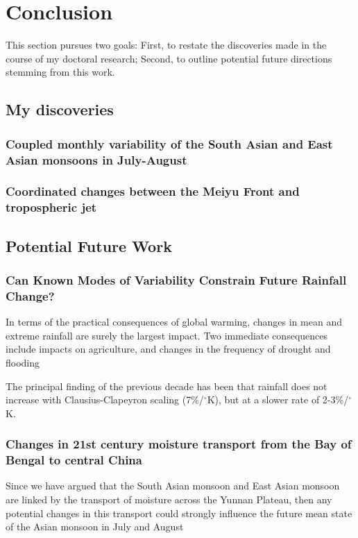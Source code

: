 \chapter{Conclusion}

This section pursues two goals: First, to restate the discoveries made in the course of my doctoral research; Second, to outline potential future directions stemming from this work.

\section{My discoveries}

\subsection{Coupled monthly variability of the South Asian and East Asian monsoons in July-August}

\subsection{Coordinated changes between the Meiyu Front and tropospheric jet}

\section{Potential Future Work}

\subsection{Can Known Modes of Variability Constrain Future Rainfall Change?}

In terms of the practical consequences of global warming, changes in mean and extreme rainfall are surely the largest impact. Two immediate consequences include impacts on agriculture, and changes in the frequency of drought and flooding

The principal finding of the previous decade has been that rainfall does not increase with Clausius-Clapeyron scaling (7\%/$^{\circ}$K), but at a slower rate of 2-3\%/$^{\circ}$K.

\subsection{Changes in 21st century moisture transport from the Bay of Bengal to central China}

Since we have argued that the South Asian monsoon and East Asian monsoon are linked by the transport of moisture across the Yunnan Plateau, then any potential changes in this transport could strongly influence the future mean state of the Asian monsoon in July and August

